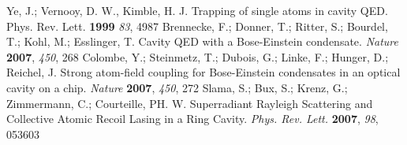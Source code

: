 \documentclass[atoms,article,submit,moreauthors,pdftex,12pt,a4paper]{mdpi}
\begin{document}
\begin{thebibliography}{999}

Ye, J.; Vernooy, D. W., Kimble, H. J. Trapping of single atoms in cavity QED. {\rm Phys. Rev. Lett.} {\bf 1999} {\em 83}, 4987
Brennecke, F.; Donner, T.; Ritter, S.; Bourdel, T.; Kohl, M.; Esslinger, T. Cavity QED with a Bose-Einstein condensate. {\em Nature} {\bf 2007}, {\em 450}, 268
Colombe, Y.; Steinmetz, T.; Dubois, G.; Linke, F.; Hunger, D.; Reichel, J. Strong atom-field coupling for Bose-Einstein condensates in an optical cavity on a chip. {\em Nature} {\bf 2007}, {\em 450}, 272
Slama, S.; Bux, S.; Krenz, G.; Zimmermann, C.; Courteille, PH. W. Superradiant Rayleigh Scattering and Collective Atomic Recoil Lasing in a Ring Cavity. {\em Phys. Rev. Lett.} {\bf 2007}, {\em 98}, 053603

\end{thebibliography}
\end{document}
